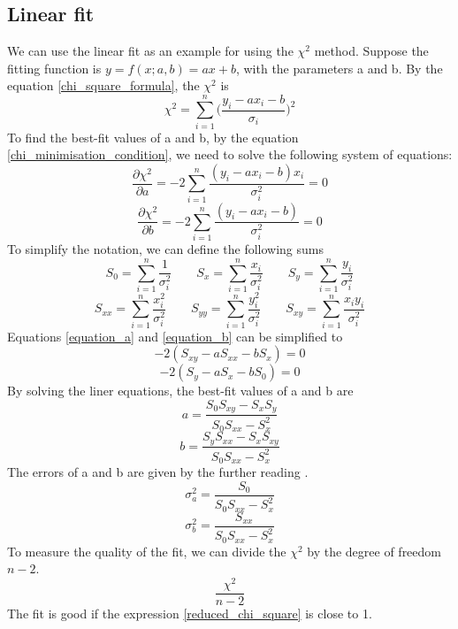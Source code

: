 \documentclass[12pt,a4paper]{report}
\begin{document}
\subsection{Linear fit}
We can use the linear fit as an example for using the $\chi^2$ method.
Suppose the fitting function is $y = f(x;a,b) = ax + b$, with the parameters a and b.
By the equation \ref{chi_square_formula}, the $\chi^2$ is
\begin{equation}
\chi^2 = \sum_{i = 1}^{n} \Big ( \frac{y_i - a x_i - b}{\sigma_i} \Big )^2
\end{equation}
To find the best-fit values of a and b, by the equation \ref{chi_minimisation_condition}, we need to solve the following system of equations:
\begin{equation} \label{equation_a}
\frac{\partial \chi^2}{\partial a} = -2 \sum_{i = 1}^{n} \frac{ (y_i - a x_i - b) x_i }{\sigma_i^2} = 0
\end{equation}
\begin{equation} \label{equation_b}
\frac{\partial \chi^2}{\partial b} = -2 \sum_{i = 1}^{n} \frac{ (y_i - a x_i - b) }{\sigma_i^2} = 0
\end{equation}
To simplify the notation, we can define the following sums
\begin{equation*}
S_0 = \sum_{i = 1}^{n} \frac{1}{\sigma_i^2} \qquad
S_x = \sum_{i = 1}^{n} \frac{x_i}{\sigma_i^2} \qquad
S_y = \sum_{i = 1}^{n} \frac{y_i}{\sigma_i^2}
\end{equation*}
\begin{equation*}
S_{xx} = \sum_{i = 1}^{n} \frac{x_i^2}{\sigma_i^2} \qquad
S_{yy} = \sum_{i = 1}^{n} \frac{y_i^2}{\sigma_i^2} \qquad
S_{xy} = \sum_{i = 1}^{n} \frac{x_i y_i}{\sigma_i^2}
\end{equation*}
Equations \ref{equation_a} and \ref{equation_b} can be simplified to
\begin{equation}
-2(S_{xy} - a S_{xx} - b S_x) = 0
\end{equation}
\begin{equation}
-2(S_y - a S_x - b S_0) = 0
\end{equation}
By solving the liner equations, the best-fit values of a and b are
\begin{equation}
a = \frac{S_0 S_{xy} - S_x S_y}{S_0 S_{xx} - S_x^2}
\end{equation}
\begin{equation}
b = \frac{S_y S_{xx} - S_x S_{xy}}{S_0 S_{xx} - S_x^2}
\end{equation}
The errors of a and b are given by the further reading \cite{stat_2}.
\begin{equation}
\sigma_a^2 = \frac{S_0}{S_0 S_{xx} - S_x^2}
\end{equation}
\begin{equation}
\sigma_b^2 = \frac{S_{xx}}{S_0 S_{xx} - S_x^2}
\end{equation}
To measure the quality of the fit, we can divide the $\chi^2$ by the degree of freedom $n-2$.
\begin{equation} \label{reduced_chi_square}
\frac{\chi^2}{n-2}
\end{equation}
The fit is good if the expression \ref{reduced_chi_square} is close to 1.
\end{document}
